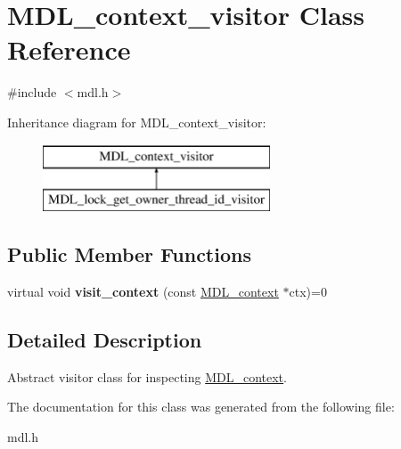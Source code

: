 \hypertarget{classMDL__context__visitor}{}\section{M\+D\+L\+\_\+context\+\_\+visitor Class Reference}
\label{classMDL__context__visitor}


{\ttfamily \#include $<$mdl.\+h$>$}

Inheritance diagram for M\+D\+L\+\_\+context\+\_\+visitor\+:\begin{figure}[H]
\begin{center}
\leavevmode
\includegraphics[height=2.000000cm]{classMDL__context__visitor}
\end{center}
\end{figure}
\subsection*{Public Member Functions}
\begin{DoxyCompactItemize}
\item 
\mbox{\label{classMDL__context__visitor_ace3365133a8534404e5c46ca40737aa4}} 
virtual void {\bfseries visit\+\_\+context} (const \mbox{\hyperlink{classMDL__context}{M\+D\+L\+\_\+context}} $\ast$ctx)=0
\end{DoxyCompactItemize}


\subsection{Detailed Description}
Abstract visitor class for inspecting \mbox{\hyperlink{classMDL__context}{M\+D\+L\+\_\+context}}. 

The documentation for this class was generated from the following file\+:\begin{DoxyCompactItemize}
\item 
mdl.\+h\end{DoxyCompactItemize}
